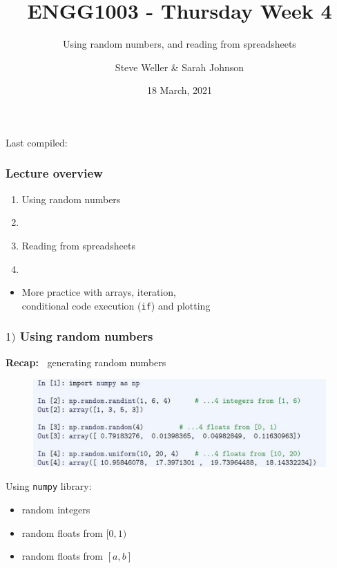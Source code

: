 \documentclass[english,14pt]{beamer}
\title{ENGG1003 - Thursday Week 4}
\subtitle{Using random numbers, and reading from spreadsheets}
\author{Steve Weller \& Sarah Johnson}
\institute{University of Newcastle}
\date{18 March, 2021}
\begin{document}
\begin{flushleft}
{\scriptsize Last compiled:~\DTMnow}
\vspace*{-5mm}
\end{flushleft}
\framebreak


\begin{frame}[fragile]

\frametitle{Lecture overview}
\begin{enumerate}
	\item Using random numbers


	\item[]
	
	\item Reading from spreadsheets

	\item[]
\end{enumerate}

\begin{itemize}
	\item More practice with arrays, iteration, \\ conditional code execution (\texttt{if}) and plotting
\end{itemize}

\end{frame}


\begin{frame}[fragile]

\frametitle{$1)$ Using random numbers}

\textbf{Recap:~} generating random numbers

\begin{figure}[ht]
	\centering
	\includegraphics[width=\textwidth]{figures/LLp55b}
\end{figure}
\vspace*{-3mm}
Using \texttt{numpy} library:
\begin{itemize}
	\item random integers
	\item random floats from $[0,1)$
	\item random floats from $[a,b]$
\end{itemize}

\end{frame}
\end{document}
